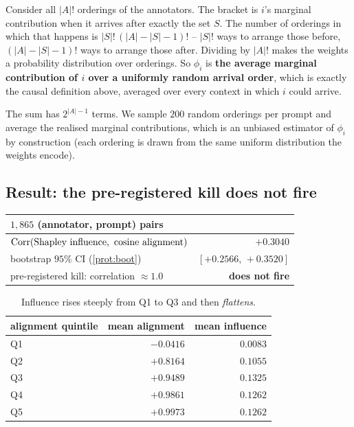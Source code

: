  Consider all $|A|!$ orderings of the annotators.
The bracket is $i$'s marginal contribution when it arrives after exactly the set
$S$. The number of orderings in which that happens is $|S|!\,(|A|-|S|-1)!$ --
$|S|!$ ways to arrange those before, $(|A|-|S|-1)!$ ways to arrange those after.
Dividing by $|A|!$ makes the weights a probability distribution over orderings.
So $\phi_i$ is \textbf{the average marginal contribution of $i$ over a uniformly
random arrival order}, which is exactly the causal definition above, averaged
over every context in which $i$ could arrive.

 The sum has $2^{|A|-1}$ terms. We sample $200$ random
orderings per prompt and average the realised marginal contributions, which is an
unbiased estimator of $\phi_i$ by construction (each ordering is drawn from the
same uniform distribution the weights encode).

\subsection{Result: the pre-registered kill does not fire}

\begin{table}[H]\centering\small
\begin{tabular}{lr}
\toprule
$1{,}865$ (annotator, prompt) pairs & \\
\midrule
$\operatorname{Corr}(\text{Shapley influence},\ \text{cosine alignment})$ & $+0.3040$\\
bootstrap $95\%$ CI (\cref{prot:boot}) & $[+0.2566,\,+0.3520]$\\
pre-registered kill: correlation $\approx 1.0$ & \textbf{does not fire}\\
\bottomrule
\end{tabular}
\end{table}

\begin{table}[H]\centering\small
\begin{tabular}{lrr}
\toprule
alignment quintile & mean alignment & mean influence\\
\midrule
Q1 & $-0.0416$ & $0.0083$\\
Q2 & $+0.8164$ & $0.1055$\\
Q3 & $+0.9489$ & $\mathbf{0.1325}$\\
Q4 & $+0.9861$ & $0.1262$\\
Q5 & $+0.9973$ & $0.1262$\\
\bottomrule
\end{tabular}
\caption{Influence rises steeply from Q1 to Q3 and then \emph{flattens}.}
\label{tab:quintile}
\end{table}

